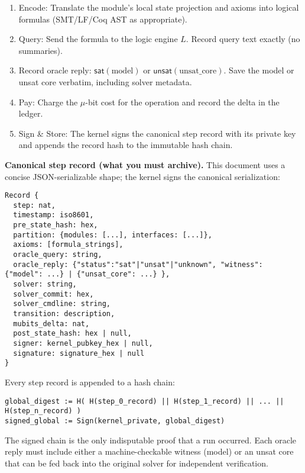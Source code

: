 \documentclass[11pt]{article}
\begin{document}
\begin{enumerate}
  \item Encode: Translate the module’s local state projection and axioms into logical formulas (SMT/LF/Coq AST as appropriate).
  \item Query: Send the formula to the logic engine $L$. Record query text exactly (no summaries).
  \item Record oracle reply: \(\mathsf{sat}(\text{model})\) or \(\mathsf{unsat}(\text{unsat\_core})\). Save the model or unsat core verbatim, including solver metadata.
  \item Pay: Charge the $\mu$-bit cost for the operation and record the delta in the ledger.
  \item Sign \& Store: The kernel signs the canonical step record with its private key and appends the record hash to the immutable hash chain.
\end{enumerate}

\textbf{Canonical step record (what you must archive).} This document uses a concise JSON-serializable shape; the kernel signs the canonical serialization:

\begin{verbatim}
Record {
  step: nat,
  timestamp: iso8601,
  pre_state_hash: hex,
  partition: {modules: [...], interfaces: [...]},
  axioms: [formula_strings],
  oracle_query: string,
  oracle_reply: {"status":"sat"|"unsat"|"unknown", "witness": {"model": ...} | {"unsat_core": ...} },
  solver: string,
  solver_commit: hex,
  solver_cmdline: string,
  transition: description,
  mubits_delta: nat,
  post_state_hash: hex | null,
  signer: kernel_pubkey_hex | null,
  signature: signature_hex | null
}
\end{verbatim}

Every step record is appended to a hash chain:
\begin{verbatim}
global_digest := H( H(step_0_record) || H(step_1_record) || ... || H(step_n_record) )
signed_global := Sign(kernel_private, global_digest)
\end{verbatim}

The signed chain is the only indisputable proof that a run occurred. Each oracle reply must include either a machine-checkable witness (model) or an unsat core that can be fed back into the original solver for independent verification.
\end{document}
